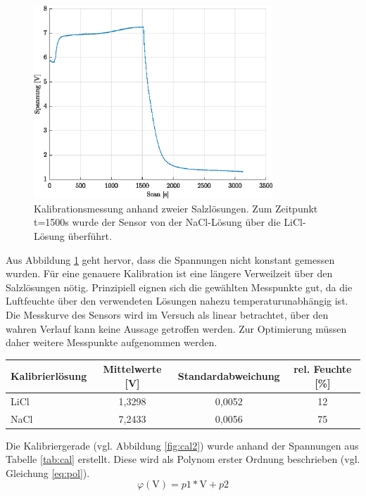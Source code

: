 \begin{figure}[H]
	\centering
	\includegraphics[width=0.8\textwidth]{../DATA/Messreihe_Feuchtekalibration.eps}
	\caption[Kalibrationsmessung]{Kalibrationsmessung anhand zweier Salzlösungen. Zum Zeitpunkt t=1500s wurde der Sensor von der NaCl-Lösung über die LiCl-Lösung überführt.}
	\label{fig:cal}
\end{figure}

Aus Abbildung \ref{fig:cal} geht hervor, dass die Spannungen nicht konstant gemessen wurden. Für eine genauere Kalibration ist eine längere Verweilzeit über den Salzlösungen nötig. Prinzipiell eignen sich die gewählten Messpunkte gut, da die Luftfeuchte über den verwendeten Lösungen nahezu temperaturunabhängig ist. Die Messkurve des Sensors wird im Versuch als linear betrachtet, über den wahren Verlauf kann keine Aussage getroffen werden. Zur Optimierung müssen daher weitere Messpunkte aufgenommen werden.
\begin{center}
	\begin{tabular}{l|c|c|c}
		\label{tab:cal}
		
		\textbf{Kalibrierlösung} & \textbf{Mittelwerte} [V]& \textbf{Standardabweichung} & rel. Feuchte [\%]\\
		\hline
		LiCl & 1,3298 & 0,0052 & 12\\
		NaCl & 7,2433 & 0,0056 & 75
	\end{tabular}
\end{center}

Die Kalibriergerade (vgl. Abbildung \ref{fig:cal2}) wurde anhand der Spannungen aus Tabelle \ref{tab:cal} erstellt. Diese wird als Polynom erster Ordnung beschrieben (vgl. Gleichung \ref{eq:pol}).
\begin{equation}
	\label{eq:pol}
	\varphi(\text{V}) = p1*\text{V} + p2
\end{equation}

